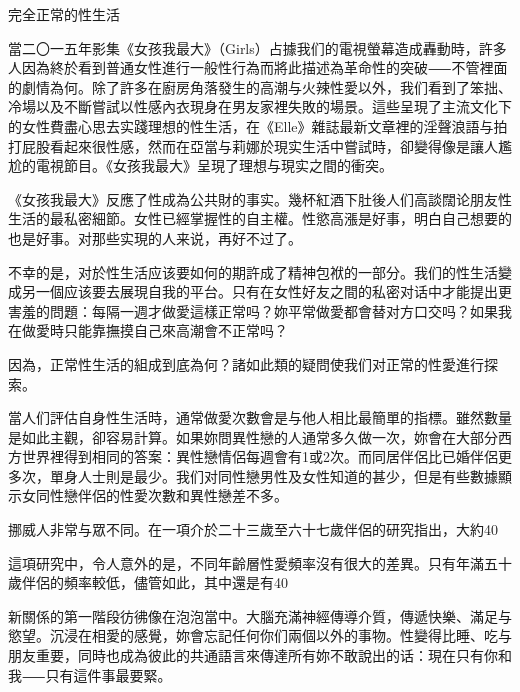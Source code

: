 \documentclass[12pt,UTF8]{ctexbook}
\begin{document}
完全正常的性生活




當二〇一五年影集《女孩我最大》（Girls）占據我们的電視螢幕造成轟動時，許多人因為終於看到普通女性進行一般性行為而將此描述為革命性的突破⸺不管裡面的劇情為何。除了許多在廚房角落發生的高潮与火辣性愛以外，我们看到了笨拙、冷場以及不斷嘗試以性感內衣現身在男友家裡失敗的場景。這些呈現了主流文化下的女性費盡心思去实踐理想的性生活，在《Elle》雜誌最新文章裡的淫聲浪語与拍打屁股看起來很性感，然而在亞當与莉娜於現实生活中嘗試時，卻變得像是讓人尷尬的電視節目。《女孩我最大》呈現了理想与現实之間的衝突。

《女孩我最大》反應了性成為公共財的事实。幾杯紅酒下肚後人们高談闊论朋友性生活的最私密細節。女性已經掌握性的自主權。性慾高漲是好事，明白自己想要的也是好事。对那些实現的人来说，再好不过了。

不幸的是，对於性生活应该要如何的期許成了精神包袱的一部分。我们的性生活變成另一個应该要去展現自我的平台。只有在女性好友之間的私密对话中才能提出更害羞的問題：每隔一週才做愛這樣正常吗？妳平常做愛都會替对方口交吗？如果我在做愛時只能靠撫摸自己來高潮會不正常吗？





因為，正常性生活的組成到底為何？諸如此類的疑問使我们对正常的性愛進行探索。

當人们評估自身性生活時，通常做愛次數會是与他人相比最簡單的指標。雖然數量是如此主觀，卻容易計算。如果妳問異性戀的人通常多久做一次，妳會在大部分西方世界裡得到相同的答案：異性戀情侶每週會有1或2次。而同居伴侶比已婚伴侶更多次，單身人士則是最少。我们对同性戀男性及女性知道的甚少，但是有些數據顯示女同性戀伴侶的性愛次數和異性戀差不多。

挪威人非常与眾不同。在一項介於二十三歲至六十七歲伴侶的研究指出，大約40%

這項研究中，令人意外的是，不同年齡層性愛頻率沒有很大的差異。只有年滿五十歲伴侶的頻率較低，儘管如此，其中還是有40%

新關係的第一階段彷彿像在泡泡當中。大腦充滿神經傳導介質，傳遞快樂、滿足与慾望。沉浸在相愛的感覺，妳會忘記任何你们兩個以外的事物。性變得比睡、吃与朋友重要，同時也成為彼此的共通語言來傳達所有妳不敢說出的话：現在只有你和我⸺只有這件事最要緊。
\end{document}
